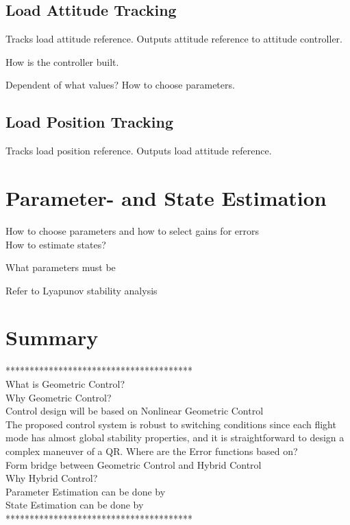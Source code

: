 		\subsection{Load Attitude Tracking}
		
		Tracks load attitude reference. Outputs attitude reference to attitude controller.
			
		How is the controller built.
		
		Dependent of what values? 	How to choose parameters.
		
		
		\subsection{Load Position Tracking}
		
		Tracks load position reference. Outputs load attitude reference.
		

\section{Parameter- and State Estimation}

How to choose parameters and how to select gains for errors\\

How to estimate states?



What parameters must be 

Refer to Lyapunov stability analysis \cite{Bullo2005}

\section{Summary}

***************************************\\
What is Geometric Control?\\
Why Geometric Control?\\
Control design will be based on Nonlinear Geometric Control\\

The proposed control system is robust to switching conditions since each flight mode has almost global stability properties, and it is straightforward to design a complex maneuver of a QR. \cite{Lee2010c}
Where are the Error functions based on?\\

Form bridge between Geometric Control and Hybrid Control\\
Why Hybrid Control?\\

Parameter Estimation can be done by\\
State Estimation can be done by\\

***************************************\\